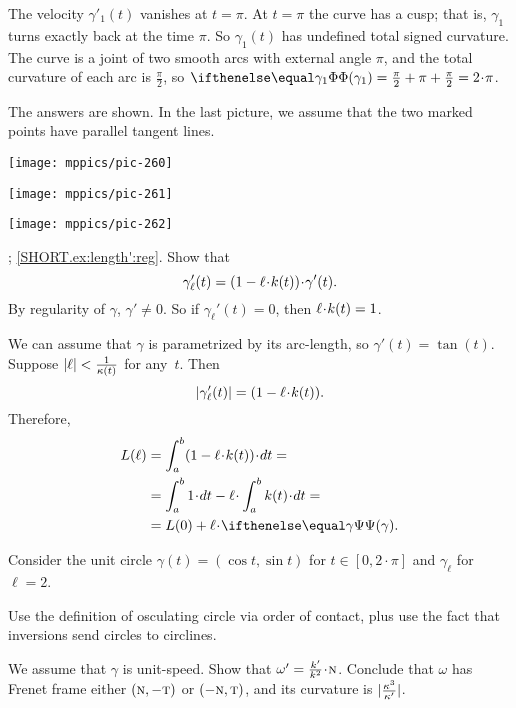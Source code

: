 \begin{multicols}{2}
The velocity $\gamma'_1(t)$ vanishes at $t=\pi$.
At $t=\pi$ the curve has a cusp;
that is, $\gamma_1$ turns exactly back at the time $\pi$.
So $\gamma_1(t)$ has undefined total signed curvature.
The curve is a joint of two smooth arcs with external angle $\pi$, and
the total curvature of each arc is $\tfrac\pi2$, so 
$\tc{\gamma_{1}}=\tfrac\pi2+\pi+\tfrac\pi2=2\cdot\pi$.


The answers are shown.
In the last picture, we assume that the two marked points have parallel tangent lines.

\begin{Figure}
\begin{minipage}{.27\textwidth}
\centering
\texttt{[image: mppics/pic-260]}
\end{minipage}\hfill
\begin{minipage}{.42\textwidth}
\centering
\texttt{[image: mppics/pic-261]}
\end{minipage}
\hfill
\begin{minipage}{.27\textwidth}
\centering
\texttt{[image: mppics/pic-262]}
\end{minipage}
\end{Figure}

\parbf{\ref{ex:length'}}; \ref{SHORT.ex:length':reg}.
Show that
\[
\gamma_\ell'(t)=(1-\ell\cdot\skur(t))\cdot \gamma'(t).
\]
By regularity of $\gamma$, $\gamma'\ne0$.
So if $\gamma_\ell'(t)=0$, then $\ell\cdot \skur(t)= 1$.

 We can assume that $\gamma$ is parametrized by its arc-length, so $\gamma'(t)=\tan(t)$.
Suppose $|\ell|<\frac{1}{\kappa(t)}$ for any~$t$.
Then 
\[
|\gamma_\ell'(t)|=(1-\ell\cdot\skur(t)).
\]
Therefore,
\begin{align*}
L(\ell)
&=
\int_a^b(1-\ell\cdot\skur(t))\cdot dt=
\\&=
\int_a^b 1\cdot dt-\ell\cdot \int_a^b\skur(t)\cdot dt=
\\
&=
L(0)+\ell\cdot\tgc\gamma.
\end{align*}



Consider the unit circle $\gamma(t)=(\cos t,\sin t)$ for $t\in[0,2\cdot\pi]$ and $\gamma_\ell$ for $\ell=2$.

Use the definition of osculating circle via order of contact, plus use the fact that inversions send circles to circlines. 

We assume that $\gamma$ is unit-speed.
Show that $\omega'=\tfrac{\skur'}{\skur^2}\cdot \norm$. 
Conclude that $\omega$ has Frenet frame either $(\text{\sc{n}},-\text{\sc{t}})$ or $(-\text{\sc{n}},\text{\sc{t}})$, and its curvature is $|\tfrac{\kappa^3}{\kappa'}|$.


\end{multicols}
